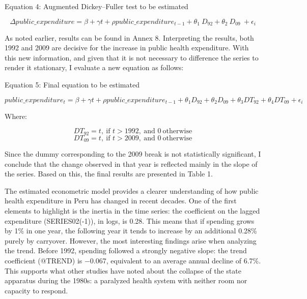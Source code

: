 \documentclass[12pt]{article}
\begin{document}
\begin{center}
Equation 4: Augmented Dickey–Fuller test to be estimated
\end{center}
\begin{equation}
\Delta public\_expenditure=\beta+\gamma t+\rho public\_expenditure_{t-1}+\theta_1\ D_{92}+\theta_2\ D_{09}\ +\epsilon_i
\end{equation}

As noted earlier, results can be found in Annex 8. Interpreting the results, both 1992 and 2009 are decisive for the increase in public health expenditure. With this new information, and given that it is not necessary to difference the series to render it stationary, I evaluate a new equation as follows:

\bigskip
\bigskip
\begin{center}
Equation 5: Final equation to be estimated
\end{center}
\begin{equation}
public\_expenditure_t=\beta+\gamma t+\rho public\_expenditure_{t-1}+ \theta_1 D_{92}+\theta_2 D_{09} + \theta_3 DT_{92}+θ_4DT_{09}+ \epsilon_i
\end{equation}
\begin{center}
    Where:
\end{center}
\begin{equation*}
{DT}_{92}=t,\ \text{if } t>1992,\ \text{and } 0\ \text{otherwise}
\end{equation*}
\begin{equation*}
{DT}_{09}=t,\ \text{if } t>2009,\ \text{and } 0\ \text{otherwise}
\end{equation*}

Since the dummy corresponding to the 2009 break is not statistically significant, I conclude that the change observed in that year is reflected mainly in the slope of the series. Based on this, the final results are presented in Table 1.

The estimated econometric model provides a clearer understanding of how public health expenditure in Peru has changed in recent decades. One of the first elements to highlight is the inertia in the time series: the coefficient on the lagged expenditure (SERIES02(-1)), in logs, is 0.28. This means that if spending grows by 1\% in one year, the following year it tends to increase by an additional 0.28\% purely by carryover. However, the most interesting findings arise when analyzing the trend. Before 1992, spending followed a strongly negative slope: the trend coefficient (@TREND) is −0.067, equivalent to an average annual decline of 6.7\%. This supports what other studies have noted about the collapse of the state apparatus during the 1980s: a paralyzed health system with neither room nor capacity to respond.
\end{document}

